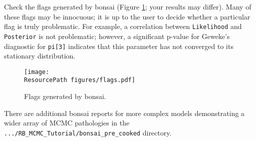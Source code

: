 Check the flags generated by bonsai (Figure \ref{fig:flags}; your results may differ). 
Many of these flags may be innocuous; it is up to the user to decide whether a particular flag is truly problematic.
For example, a correlation between \texttt{Likelihood} and \texttt{Posterior} is not problematic; however, a significant p-value for Geweke's diagnostic for \texttt{pi[3]} indicates that this parameter has not converged to its stationary distribution.

\begin{figure}[h!]
\begin{center}
\texttt{[image: \\ResourcePath figures/flags.pdf]}
\end{center}
\caption{Flags generated by bonsai.}\label{fig:flags}
\end{figure}

There are additional bonsai reports for more complex models demonstrating a wider array of MCMC pathologies in the \verb!.../RB_MCMC_Tutorial/bonsai_pre_cooked! directory.





